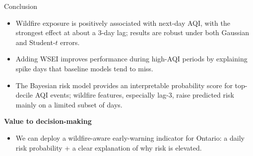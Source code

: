\documentclass[aspectratio=169]{beamer}
\begin{document}
\begin{frame}{Conclusion}
\begin{itemize}
    \item Wildfire exposure is positively associated with next-day AQI, with the strongest effect at about a 3-day lag; results are robust under both Gaussian and Student-$t$ errors.
    \item Adding WSEI improves performance during high-AQI periods by explaining spike days that baseline models tend to miss.
    \item The Bayesian risk model provides an interpretable probability score for top-decile AQI events; wildfire features, especially lag-3, raise predicted risk mainly on a limited subset of days.
\end{itemize}

\vspace{0.5em}
\textbf{Value to decision-making}
\begin{itemize}
    \item We can deploy a wildfire-aware early-warning indicator for Ontario: a daily risk probability + a clear explanation of why risk is elevated.
\end{itemize}
\end{frame}
\end{document}
